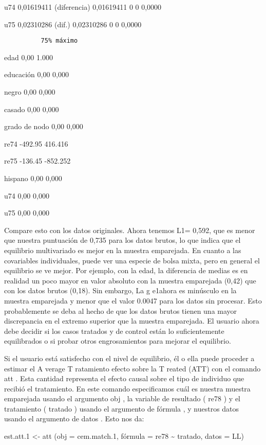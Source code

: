 \documentclass[
]{book}
\begin{document}
u74 0,01619411 (diferencia) 0,01619411 0 0 0,0000

u75 0,02310286 (dif.) 0,02310286 0 0 0,0000

\begin{verbatim}
          75% máximo
\end{verbatim}

edad 0,00 1.000

educación 0,00 0,000

negro 0,00 0,000

casado 0,00 0,000

grado de nodo 0,00 0,000

re74 -492.95 416.416

re75 -136.45 -852.252

hispano 0,00 0,000

u74 0,00 0,000

u75 0,00 0,000

Compare esto con los datos originales. Ahora tenemos L1= 0,592, que es menor que nuestra puntuación de 0,735 para los datos brutos, lo que indica que el equilibrio multivariado es mejor en la muestra emparejada. En cuanto a las covariables individuales, puede ver una especie de bolsa mixta, pero en general el equilibrio se ve mejor. Por ejemplo, con la edad, la diferencia de medias es en realidad un poco mayor en valor absoluto con la muestra emparejada (0,42) que con los datos brutos (0,18). Sin embargo, La g e1ahora es minúsculo en la muestra emparejada y menor que el valor 0.0047 para los datos sin procesar. Esto probablemente se deba al hecho de que los datos brutos tienen una mayor discrepancia en el extremo superior que la muestra emparejada. El usuario ahora debe decidir si los casos tratados y de control están lo suficientemente equilibrados o si probar otros engrosamientos para mejorar el equilibrio.

Si el usuario está satisfecho con el nivel de equilibrio, él o ella puede proceder a estimar el A verage T ratamiento efecto sobre la T reated (ATT) con el comando att . Esta cantidad representa el efecto causal sobre el tipo de individuo que recibió el tratamiento. En este comando especificamos cuál es nuestra muestra emparejada usando el argumento obj , la variable de resultado ( re78 ) y el tratamiento ( tratado ) usando el argumento de fórmula , y nuestros datos usando el argumento de datos . Esto nos da:

est.att.1 \textless- att (obj = cem.match.1, fórmula = re78 \textasciitilde{} tratado, datos = LL)
\end{document}
